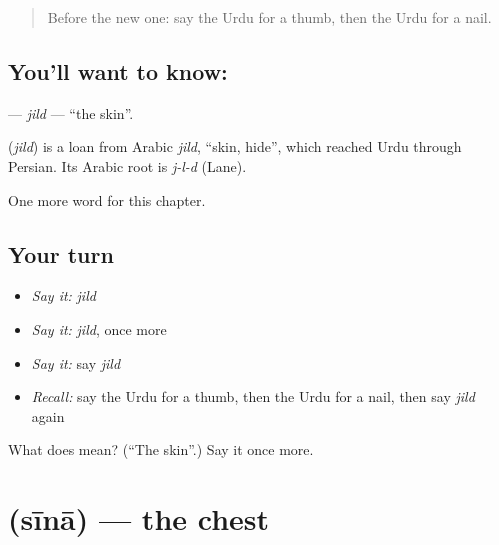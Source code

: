 \label{lesson:UR-C130-jild}



\begin{quote}
Before the new one: say the Urdu for a thumb, then the Urdu for a nail.
\end{quote}

\subsection*{You'll want to know: }
\textbf{} — \emph{jild} — \textquotedblleft{}the skin\textquotedblright{}.

\begin{cousinweb}
\textbf{} (\emph{jild}) is a loan from Arabic \emph{jild}, \textquotedblleft{}skin, hide\textquotedblright{}, which reached Urdu through Persian. Its Arabic root is \emph{j-l-d} (Lane).
\end{cousinweb}

\begin{grammarlens}[title={What you've built}]
One more word for this chapter.
\end{grammarlens}

\subsection*{Your turn}
\begin{itemize}
\raggedright
  \item \emph{Say it:} \emph{jild}
  \item \emph{Say it:} \emph{jild}, once more
  \item \emph{Say it:} say \emph{jild}
  \item \emph{Recall:} say the Urdu for a thumb, then the Urdu for a nail, then say \emph{jild} again
\end{itemize}

\begin{tcolorbox}[breakable,colback=teal!4,colframe=teal!35!black,title={Before you move on}]
What does  mean? (\textquotedblleft{}The skin\textquotedblright{}.) Say it once more.
\end{tcolorbox}
\section[\texorpdfstring{\ur{سینہ} (sīnā)}{سینہ (sīnā)}]{ (sīnā) — the chest}

\label{lesson:UR-C130-sina}




